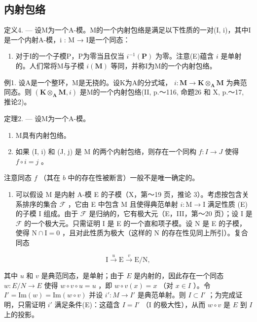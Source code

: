 \subsection{内射包络}

定义4. --- 设M为一个A-模。M的一个内射包络是满足以下性质的一对(I, i)，其中I是一个内射A-模，i : M → I是一个同态：

\begin{enumerate}
\def\labelenumi{(\Alph{enumi})}
\setcounter{enumi}{4}
\tightlist
\item
  对于I的一个子模P，P为零当且仅当 \(i^{-1}(\mathbf{P})\) 为零。注意(E)蕴含 \(i\) 是单射的。人们常将M与子模 \(i(\mathbf{M})\) 等同，并称I为M的一个内射包络。
\end{enumerate}

例1. 设A是一个整环，M是无挠的。设K为A的分式域， \(i: \mathbf{M} \to \mathbf{K} \otimes_{\mathbf{A}} \mathbf{M}\) 为典范同态。则 \((\mathbf{K} \otimes_{\mathbf{A}} \mathbf{M}, i)\) 是M的一个内射包络(II, p.～116, 命题26 和 X, p.～17, 推论2)。

定理2. --- 设M为一个A-模。

\begin{enumerate}
\def\labelenumi{\alph{enumi})}
\item
  M具有内射包络。
\item
  如果 (I, i) 和 (J, j) 是 M 的两个内射包络，则存在一个同构 \(f: I \to J\) 使得 \(f \circ i = j\) 。
\end{enumerate}

注意同态 \(f\) （其在 \(b\) 中的存在性被断言）一般不是唯一确定的。

\begin{enumerate}
\def\labelenumi{\alph{enumi})}
\tightlist
\item
  可以假设 M 是内射 A-模 E 的子模（X，第～19 页，推论 3）。考虑按包含关系排序的集合 \(\mathcal{F}\) ，它由 E 中包含 M 且使得典范单射 \(i: \mathrm{M} \to \mathrm{I}\) 满足性质 (E) 的子模 I 组成。由于 \(\mathcal{F}\) 是归纳的，它有极大元（E，III，第～20 页）；设 I 是 \(\mathcal{F}\) 的一个极大元。只需证明 I 是 E 的一个直和项子模。设 N 是 E 的子模，使得 \(\mathrm{N} \cap \mathrm{I} = 0\) ，且对此性质为极大（这样的 N 的存在性见同上所引）。复合同态
\end{enumerate}

\[
\mathrm{I} \xrightarrow {u} \mathrm{E} \xrightarrow {v} \mathrm{E} / \mathrm{N},
\]

其中 \(u\) 和 \(v\) 是典范同态，是单射；由于 \(E\) 是内射的，因此存在一个同态 \(w: E/N \to E\) 使得 \(w \circ v \circ u = u\) ，即 \(w \circ v(x) = x\) （对 \(x \in I\) ）。令 \(I' = \text{Im}(w) = \text{Im}(w \circ v)\) 并设 \(i': M \to I'\) 是典范单射。则 \(I \subset I'\) ；为完成证明，只需证明 \(i'\) 满足条件(E)：这蕴含 \(I = I'\) （I 的极大性），从而 \(w \circ v\) 是 \(E\) 到 \(I\) 上的投影。


